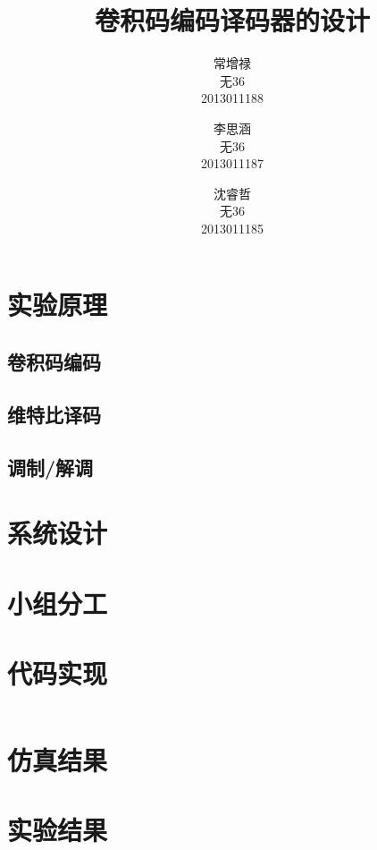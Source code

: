 \documentclass{ctexart}
\title{卷积码编码译码器的设计}
\author{常增禄 \\ 无36 \\ 2013011188 \and
        李思涵 \\ 无36 \\ 2013011187 \and
        沈睿哲 \\ 无36 \\ 2013011185}
\begin{document}
\maketitle

\section{实验原理}

\subsection{卷积码编码}

\subsection{维特比译码}

\subsection{调制/解调}

\section{系统设计}

\section{小组分工}

\section{代码实现}

\begin{verbatim}

\end{verbatim}

\section{仿真结果}

\section{实验结果}
\end{document}
